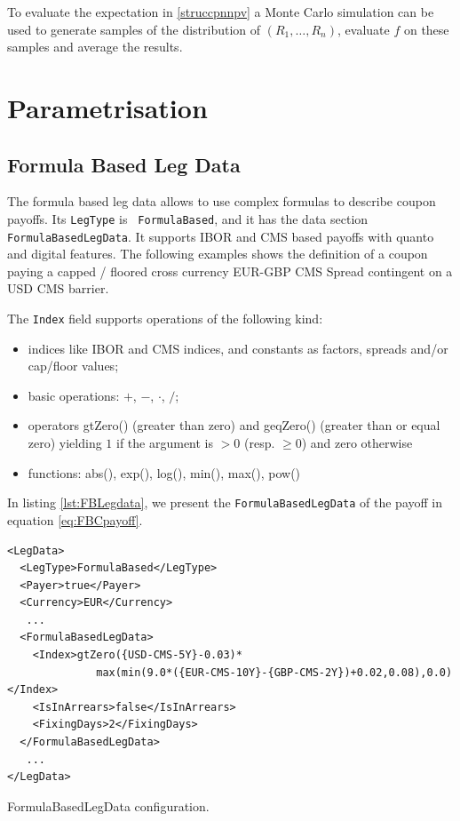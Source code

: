 \documentclass[12pt, a4paper]{article}
\begin{document}
To evaluate the expectation in \ref{struccpnnpv} a Monte Carlo
simulation can be used to generate samples of the distribution of
$(R_1, \ldots, R_n)$, evaluate $f$ on these samples and average the
results.

\section{Parametrisation}


\subsection{Formula Based Leg Data}

The formula based leg data allows to use complex formulas to describe coupon payoffs. Its {\tt LegType} is {\tt
  FormulaBased}, and it has the data section {\tt FormulaBasedLegData}. It supports IBOR and CMS based payoffs with
quanto and digital features. The following examples shows the definition of a coupon paying a capped / floored cross
currency EUR-GBP CMS Spread contingent on a USD CMS barrier.



The {\tt Index} field supports operations of the following kind:
\begin{itemize}
\item indices like IBOR and CMS indices, and constants as factors,
  spreads and/or cap/floor values;
\item basic operations: $+$, $-$, $\cdot$, $/$;
\item operators gtZero() (greater than zero) and geqZero() (greater than or equal zero) yielding $1$ if the argument is
  $>0$ (resp. $\geq 0$) and zero otherwise
\item functions: abs(), exp(), log(), min(), max(), pow()
\end{itemize}
%
In listing \ref{lst:FBLegdata}, we present the {\tt FormulaBasedLegData} of the payoff in equation \ref{eq:FBCpayoff}.
%
\begin{listing}
\begin{verbatim}
<LegData>
  <LegType>FormulaBased</LegType>
  <Payer>true</Payer>
  <Currency>EUR</Currency>
   ...
  <FormulaBasedLegData>
    <Index>gtZero({USD-CMS-5Y}-0.03)*
              max(min(9.0*({EUR-CMS-10Y}-{GBP-CMS-2Y})+0.02,0.08),0.0)</Index>
    <IsInArrears>false</IsInArrears>
    <FixingDays>2</FixingDays>
  </FormulaBasedLegData>
   ...
</LegData>
\end{verbatim}
\caption{FormulaBasedLegData configuration.}
\label{lst:FBLegdata}
\end{listing}
%
\end{document}
